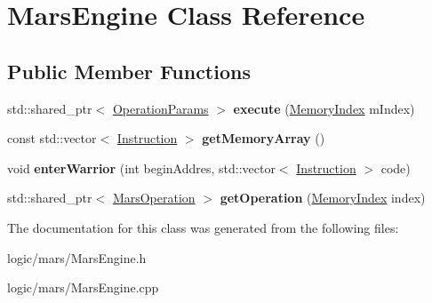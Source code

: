 \hypertarget{classMarsEngine}{}\section{Mars\+Engine Class Reference}
\label{classMarsEngine}
\subsection*{Public Member Functions}
\begin{DoxyCompactItemize}
\item 
\mbox{\label{classMarsEngine_a39ad8b0376b8032cb4abd6e32394b649}} 
std\+::shared\+\_\+ptr$<$ \hyperlink{classOperationParams}{Operation\+Params} $>$ {\bfseries execute} (\hyperlink{classMemoryIndex}{Memory\+Index} m\+Index)
\item 
\mbox{\label{classMarsEngine_ae987f2993dc6716a2ecbff8161c321b6}} 
const std\+::vector$<$ \hyperlink{classInstruction}{Instruction} $>$ {\bfseries get\+Memory\+Array} ()
\item 
\mbox{\label{classMarsEngine_afca3d92f704360f86ce5e0d588fbb0e3}} 
void {\bfseries enter\+Warrior} (int begin\+Addres, std\+::vector$<$ \hyperlink{classInstruction}{Instruction} $>$ code)
\item 
\mbox{\label{classMarsEngine_aad6972df3bbd3f9d1c4278d7b5cd51d0}} 
std\+::shared\+\_\+ptr$<$ \hyperlink{classMarsOperation}{Mars\+Operation} $>$ {\bfseries get\+Operation} (\hyperlink{classMemoryIndex}{Memory\+Index} index)
\end{DoxyCompactItemize}


The documentation for this class was generated from the following files\+:\begin{DoxyCompactItemize}
\item 
logic/mars/Mars\+Engine.\+h\item 
logic/mars/Mars\+Engine.\+cpp\end{DoxyCompactItemize}
